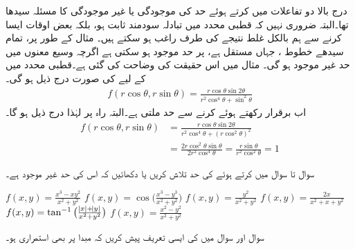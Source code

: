 درج بالا دو تفاعلات میں  کرتے ہوئے  حد کی موجودگی یا غیر موجودگی کا مسئلہ سیدھا تھا۔البتہ ضروری نہیں کہ  قطبی محدد میں تبادلہ سودمند ثابت ہو، بلکہ بعض اوقات ایسا کرنے سے ہم بالکل غلط نتیجے  کی طرف راغب ہو سکتے ہیں۔ مثال کے طور پر، تمام سیدھے خطوط ، جہاں  مستقل ہے، پر حد موجود ہو سکتی  ہے اگرچہ وسیع معنوں میں حد غیر موجود ہو گی۔ مثال  میں اس حقیقت کی وضاحت کی گئی ہے۔قطبی محدد میں  کے لیے    کی صورت درج ذیل ہو گی۔
\begin{align*}
f(r\cos\theta,r\sin\theta)=\frac{r\cos\theta\sin2\theta}{r^2\cos^4\theta+\sin^2\theta}
\end{align*}
اب   برقرار رکھتے ہوئے   کرنے سے حد  ملتی ہے۔البتہ راہ  پر لہٰذا درج ذیل ہو گا۔
\begin{align*}
f(r\cos\theta,r\sin\theta)&=\frac{r\cos\theta\sin 2\theta}{r^2\cos^4\theta+(r\cos^2\theta)^2}\\
&=\frac{2r\cos^2\theta\sin\theta}{2r^2\cos^4\theta}=\frac{r\sin\theta}{r^2\cos^2\theta}=1
\end{align*}

سوال  تا سوال  میں  کرتے ہوئے  کی حد تلاش کریں یا دکھائیں کہ اس کی حد غیر موجود ہے۔

$f(x,y)=\frac{x^3-xy^2}{x^2+y^2}$
$f(x,y)=\cos\big(\frac{x^3-y^3}{x^2+y^2}\big)$
$f(x,y)=\frac{y^2}{x^2+y^2}$
$f(x,y)=\frac{2x}{x^2+x+y^2}$
$f(x,y)=\tan^{-1}\big(\frac{\abs{x}+\abs{y}}{x^2+y^2}\big)$
$f(x,y)=\frac{x^2-y^2}{x^2+y^2}$

سوال  اور سوال  میں  کی ایسی تعریف پیش کریں کہ  مبدا پر بھی استمراری ہو۔

